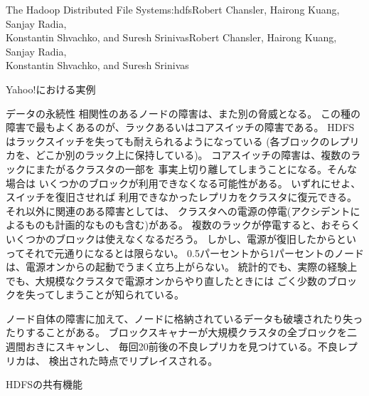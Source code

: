 \begin{aosachaptertoc}{The Hadoop Distributed File System}{s:hdfs}{Robert Chansler, Hairong Kuang, Sanjay Radia, \\ Konstantin Shvachko, and Suresh Srinivas}{Robert Chansler, Hairong Kuang, Sanjay Radia, \\ \hspace*{0.9cm} Konstantin Shvachko, and Suresh Srinivas}
\begin{aosasect1}{Yahoo!における実例}
\begin{aosasect2}{データの永続性}
相関性のあるノードの障害は、また別の脅威となる。
この種の障害で最もよくあるのが、ラックあるいはコアスイッチの障害である。
HDFSはラックスイッチを失っても耐えられるようになっている
(各ブロックのレプリカを、どこか別のラック上に保持している)。
コアスイッチの障害は、複数のラックにまたがるクラスタの一部を
事実上切り離してしまうことになる。そんな場合は
いくつかのブロックが利用できなくなる可能性がある。
いずれにせよ、スイッチを復旧させれば
利用できなかったレプリカをクラスタに復元できる。
それ以外に関連のある障害としては、
クラスタへの電源の停電(アクシデントによるものも計画的なものも含む)がある。
複数のラックが停電すると、おそらくいくつかのブロックは使えなくなるだろう。
しかし、電源が復旧したからといってそれで元通りになるとは限らない。
0.5パーセントから1パーセントのノードは、電源オンからの起動でうまく立ち上がらない。
統計的でも、実際の経験上でも、大規模なクラスタで電源オンからやり直したときには
ごく少数のブロックを失ってしまうことが知られている。

ノード自体の障害に加えて、ノードに格納されているデータも破壊されたり失ったりすることがある。
ブロックスキャナーが大規模クラスタの全ブロックを二週間おきにスキャンし、
毎回20前後の不良レプリカを見つけている。不良レプリカは、
検出された時点でリプレイスされる。

\end{aosasect2}

\begin{aosasect2}{HDFSの共有機能}


\end{aosasect2}
\end{aosasect1}
\end{aosachaptertoc}
